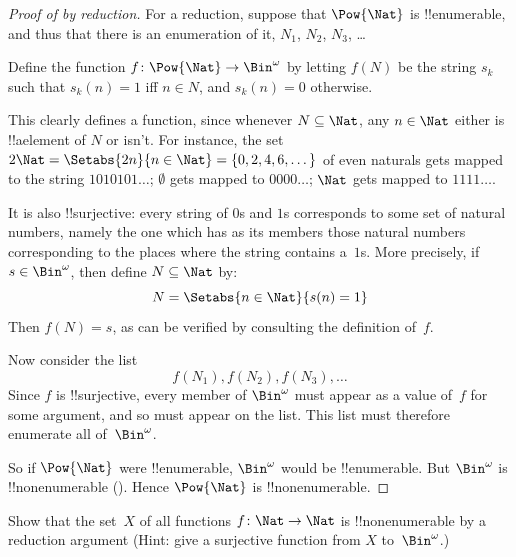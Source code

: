 \begin{proof}[Proof of {} by reduction]
For a reduction, suppose that $\Pow{\Nat}$ is !!{enumerable}, and thus that
there is an enumeration of it, $N_{1}$, $N_{2}$, $N_{3}$, \dots

Define the function $f \colon \Pow{\Nat} \to \Bin^\omega$ by letting
$f(N)$ be the string $s_{k}$ such that $s_{k}(n) = 1$ iff $n \in N$,
and $s_k(n) = 0$ otherwise.  

This clearly defines a function, since whenever $N \subseteq \Nat$,
any $n \in \Nat$ either is !!a{element} of $N$ or isn't.  For
instance, the set $2\Nat = \Setabs{2n}{n \in \Nat} = \{0,2, 4, 6,
\dots\}$ of even naturals gets mapped to the string $1010101\dots$;
$\emptyset$ gets mapped to $0000\dots$; $\Nat$ gets mapped to
$1111\dots$.

It is also !!{surjective}: every string of $0$s and $1$s corresponds
to some set of natural numbers, namely the one which has as its
members those natural numbers corresponding to the places where the string
contains a~$1$s. More precisely, if $s \in \Bin^\omega$, then define $N
\subseteq \Nat$ by:
\[
N = \Setabs{n \in \Nat}{s(n) = 1}
\]
Then $f(N) = s$, as can be verified by consulting the definition
of~$f$. 

Now consider the list
\[
f(N_1), f(N_2), f(N_3), \dots
\]
Since $f$ is !!{surjective}, every member of $\Bin^\omega$ must
appear as a value of~$f$ for some argument, and so must appear on the
list. This list must therefore enumerate all of~$\Bin^\omega$.

So if $\Pow{\Nat}$ were !!{enumerable}, $\Bin^\omega$ would be
!!{enumerable}.  But $\Bin^\omega$ is !!{nonenumerable}
(). Hence $\Pow{\Nat}$ is
!!{nonenumerable}.
\end{proof}



















\begin{prob}\label{sfr:siz:red:prob:nat-nat}
  Show that the set~$X$ of all functions $f\colon \Nat \to \Nat$ is
  !!{nonenumerable} by a reduction argument (Hint: give a surjective
  function from $X$ to~$\Bin^\omega$.)
\end{prob}

